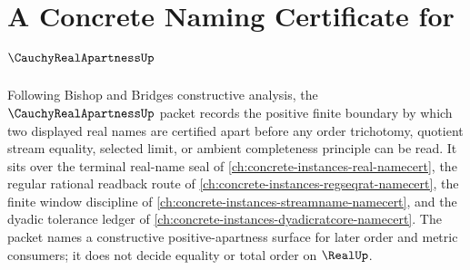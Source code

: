 \chapter{A Concrete Naming Certificate for $\CauchyRealApartnessUp$}
\label{ch:concrete-instances-cauchy-real-apartness-namecert}

Following Bishop and Bridges constructive analysis, the $\CauchyRealApartnessUp$ packet records the positive finite boundary by which two displayed real names are certified apart before any order trichotomy, quotient stream equality, selected limit, or ambient completeness principle can be read. It sits over the terminal real-name seal of \autoref{ch:concrete-instances-real-namecert}, the regular rational readback route of \autoref{ch:concrete-instances-regseqrat-namecert}, the finite window discipline of \autoref{ch:concrete-instances-streamname-namecert}, and the dyadic tolerance ledger of \autoref{ch:concrete-instances-dyadicratcore-namecert}. The packet names a constructive positive-apartness surface for later order and metric consumers; it does not decide equality or total order on $\RealUp$.

